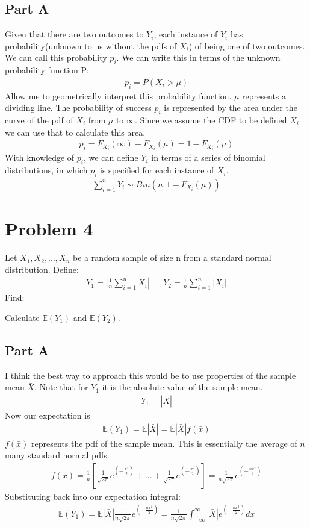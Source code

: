 \documentclass{article}
\begin{document}
\subsection*{Part A}
Given that there are two outcomes to $Y_i$, each instance of $Y_i$ has probability(unknown to us without the pdfs of $X_i$) of being one of two outcomes. We can call this probability $p_i$. We can write this in terms of the unknown probability function P:
\begin{align*}
p_i = P(X_i > \mu)
\end{align*}
Allow me to geometrically interpret this probability function. $\mu$ represents a dividing line. The probability of success $p_i$ is represented by the area under the curve of the pdf of $X_i$ from $\mu$ to $\infty$. Since we assume the CDF to be defined $X_i$ we can use that to calculate this area.
\begin{align*}
p_i = F_{X_i}(\infty) - F_{X_i}(\mu) = 1 - F_{X_i}(\mu)
\end{align*}
With knowledge of $p_i$, we can define $Y_i$ in terms of a series of binomial distributions, in which $p_i$ is specified for each instance of $X_i$.
\begin{align*}
\boxed{ \sum_{i=1}^{n} Y_i \sim Bin(n,1 - F_{X_i}(\mu)) }
\end{align*}

    
\clearpage
\section*{Problem 4}
Let $X_1, X_2,..., X_n$ be a random sample of size n from a standard normal distribution. Define:
\begin{align*}
Y_1 = |\frac{1}{n}\sum_{i=1}^{n}X_i| && Y_2 = \frac{1}{n}\sum_{i=1}^{n}|X_i|
\end{align*}
Find:

Calculate $\mathbb{E}(Y_1)$ and $\mathbb{E}(Y_2)$.
\subsection*{Part A}
I think the best way to approach this would be to use properties of the sample mean $\bar{X}$. Note that for $Y_1$ it is the absolute value of the sample mean.
\begin{align*}
Y_1 = |\bar{X}|
\end{align*}
Now our expectation is
\begin{align*}
\mathbb{E}(Y_1) = \mathbb{E}|\bar{X}| = \mathbb{E}|\bar{X}|f(\bar{x})
\end{align*}
$f(\bar{x})$ represents the pdf of the sample mean. This is essentially the average of $n$ many standard normal pdfs.
\begin{align*}
f(\bar{x}) = \frac{1}{n} [\frac{1}{\sqrt{2\pi}}e^{(-\frac{x^2}{2})} + ... + \frac{1}{\sqrt{2\pi}}e^{(-\frac{x^2}{2})}] = \frac{1}{n \sqrt{2\pi}}e^{(-\frac{n x^2}{2})}
\end{align*}
Substituting back into our expectation integral:
\begin{align*}
\mathbb{E}(Y_1) = \mathbb{E} |\bar{X}| \frac{1}{n \sqrt{2\pi}}e^{(-\frac{n x^2}{2})} = \frac{1}{n \sqrt{2\pi}} \int_{-\infty}^{\infty} |\bar{X}| e^{(-\frac{n x^2}{2})} dx
\end{align*}
\clearpage
\end{document}
